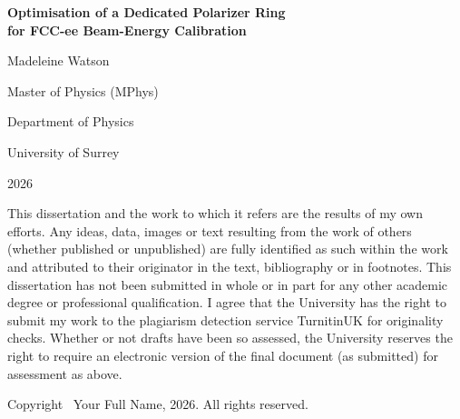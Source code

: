 \begin{titlepage}
    \centering
    \vspace*{2cm}

    {\LARGE \bfseries Optimisation of a Dedicated Polarizer Ring \\
    for FCC-ee Beam-Energy Calibration \par}

    \vspace{2cm}
    {\Large Madeleine Watson \par}

    \vspace{1cm}
    {\large Master of Physics (MPhys) \par}
    {\large Department of Physics \par}
    {\large University of Surrey \par}

    \vspace{1cm}
    {\large 2026 \par}

    \vfill

    \begin{minipage}{0.85\textwidth}
    \small
    This dissertation and the work to which it refers are the results of my own
    efforts. Any ideas, data, images or text resulting from the work of others
    (whether published or unpublished) are fully identified as such within the
    work and attributed to their originator in the text, bibliography or in
    footnotes. This dissertation has not been submitted in whole or in part for
    any other academic degree or professional qualification. I agree that the
    University has the right to submit my work to the plagiarism detection
    service TurnitinUK for originality checks. Whether or not drafts have been
    so assessed, the University reserves the right to require an electronic
    version of the final document (as submitted) for assessment as above.
    \end{minipage}

    \vspace{1cm}

    Copyright \textcopyright\ Your Full Name, 2026. All rights reserved.

\end{titlepage}